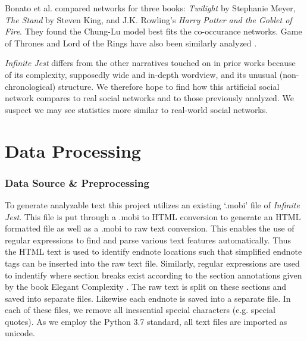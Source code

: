 \documentclass[12pt]{article}
\newcommand{\infinitejest}{{\em Infinite Jest}\xspace}
\begin{document}
Bonato et al. \cite{Bonato2016} compared networks for three books: {\em Twilight} by Stephanie Meyer, {\em The Stand} by Steven King, and J.K. Rowling's {\em Harry Potter and the Goblet of Fire}. 
They found the Chung-Lu model best fits the co-occurance networks.
Game of Thrones and Lord of the Rings have also been similarly analyzed \cite{GOT,ribeiro2016complex}.


\infinitejest differs from the other narratives touched on in prior works because of its complexity, supposedly wide and in-depth wordview, and its unusual (non-chronological) structure. We therefore hope to find how this artificial social network compares to real social networks and to those previously analyzed. We suspect we may see statistics more similar to real-world social networks.

\section*{Data Processing}

\subsubsection*{Data Source \& Preprocessing}
To generate analyzable text this project utilizes an existing `.mobi' file of \infinitejest. This file is put through a .mobi to HTML conversion to generate an HTML formatted file as well as a .mobi to raw text conversion. This enables the use of regular expressions to find and parse various text features automatically. Thus the HTML text is used to identify endnote locations such that simplified endnote tags can be inserted into the raw text file. Similarly, regular expressions are used to indentify where section breaks exist according to the section annotations given by the book Elegant Complexity \cite{carlisle_2007}. The raw text is split on these sections and saved into separate files. Likewise each endnote is saved into a separate file. In each of these files, we remove all inessential special characters (e.g. special quotes). As we employ the Python 3.7 standard, all text files are imported as unicode.
\end{document}

